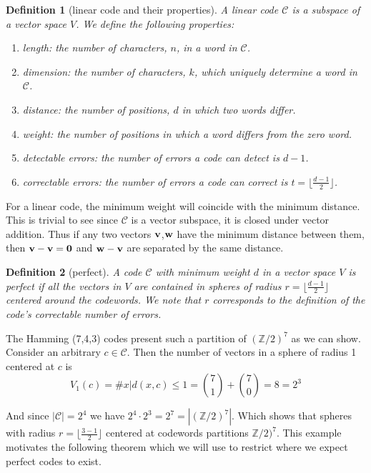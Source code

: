 \documentclass[paper=a4, fontsize=11pt]{scrartcl} %
\numberwithin{equation}{section} %
\numberwithin{figure}{section} %
\numberwithin{table}{section} %
\newtheorem{defn}{Definition}
\begin{document}
\begin{defn}[linear code and their properties]
A linear code $\mathcal{C}$ is a subspace of a vector space $V$. We define the following properties:
\begin{enumerate}
\item \textit{length}: the number of characters, $n$, in a word in $\mathcal{C}$.
\item \textit{dimension}: the number of characters, $k$, which uniquely determine a word in $\mathcal{C}$.
\item \textit{distance}: the number of positions, $d$ in which two words differ.
\item \textit{weight}: the number of positions in which a word differs from the zero word.
\item \textit{detectable errors}: the number of errors a code can detect is $d-1$.
\item \textit{correctable errors}: the number of errors a code can correct is $t=\lfloor \frac{d-1}{2} \rfloor$.
\end{enumerate} 
\end{defn}

For a linear code, the minimum weight will coincide with the minimum distance. This is trivial to see since $\mathcal{C}$ is a vector subspace, it is closed under vector addition. Thus if any two vectors $\bf{v}$,$\bf{w}$ have the minimum distance between them, then $\bf{v}-\bf{v}=\bf{0}$ and $\bf{w}-\bf{v}$ are separated by the same distance.

\begin{defn}[perfect]
A code $\mathcal{C}$ with minimum weight $d$ in a vector space $V$ is \textit{perfect} if all the vectors in $V$ are contained in spheres of radius $r=\lfloor \frac{d-1}{2} \rfloor$ centered around the codewords. We note that $r$ corresponds to the definition of the code's correctable number of errors.
\end{defn}

The Hamming (7,4,3) codes present such a partition of $(\mathbb{Z}/2)^7$ as we can show. Consider an arbitrary $c \in \mathcal{C}$. Then the number of vectors in a sphere of radius 1 centered at $c$ is
$$
V_1(c) = \#{x | d(x,c)\leq 1} = {7 \choose 1} + {7 \choose 0} = 8 = 2^3
$$

And since $|\mathcal{C}|= 2^4$ we have $2^4 \cdot 2^3 = 2^7=|(\mathbb{Z}/2)^7|$. Which shows that spheres with radius $r = \lfloor \frac{3-1}{2} \rfloor$ centered at codewords partitions $\mathbb{Z}/2)^7$. This example motivates the following theorem which we will use to restrict where we expect perfect codes to exist.
\end{document}
